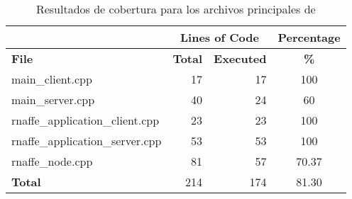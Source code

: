       \begin{table}[!htf]
        \begin{center}
          \begin{tabular}{|l|r|r|c|}
            \hline
            & \multicolumn{2}{|c|}{Lines of Code} & Percentage \\
            \hline
            \textbf{File} & \textbf{Total} & \textbf{Executed} &  \hspace{1cm}\textbf{\%} \\
            \hline
            \scriptsize{main\_client.cpp} & 17 & 17 & 100 \\
            \hline 
            \scriptsize{main\_server.cpp} & 40 & 24 & 60 \\
            \hline 
            \scriptsize{rnaffe\_application\_client.cpp} & 23 & 23 & 100 \\
            \hline 
            \scriptsize{rnaffe\_application\_server.cpp} & 53 & 53 & 100 \\
            \hline 
            \scriptsize{rnaffe\_node.cpp} & 81 & 57 & 70.37 \\
            \hline 
            \textbf{Total} & 214 & 174 & 81.30 \\
            \hline 
          \end{tabular}
          \caption{Resultados de cobertura para los archivos principales de \rnaffe} \label{rnaffecov}
        \end{center}
      \end{table}
      
